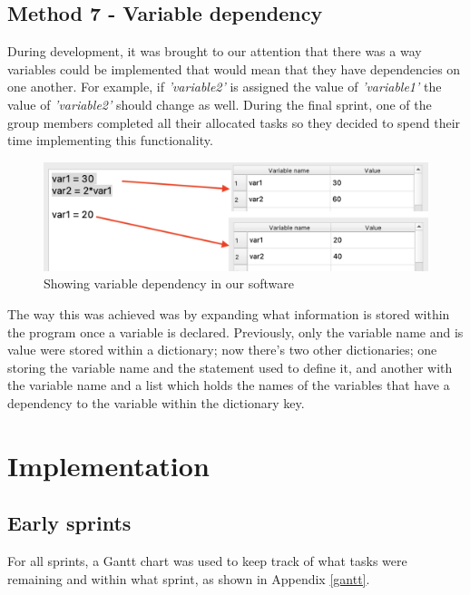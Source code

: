 \documentclass[a4paper, oneside, 11pt]{report}
\begin{document}
\section{Method 7 - Variable dependency}\label{variable-dep-sec}

During development, it was brought to our attention that there was a way variables could be implemented that would mean that they have dependencies on one another. For example, if \emph{'variable2'} is assigned the value of \emph{'variable1'} the value of \emph{'variable2'} should change as well. During the final sprint, one of the group members completed all their allocated tasks so they decided to spend their time implementing this functionality.

\begin{figure}[H]
    \centering
    \includegraphics[width=13cm]{variabledep.png}
    \caption{Showing variable dependency in our software}
    \label{fig:variable_dep}
\end{figure}

The way this was achieved was by expanding what information is stored within the program once a variable is declared. Previously, only the variable name and is value were stored within a dictionary; now there's two other dictionaries; one storing the variable name and the statement used to define it, and another with the variable name and a list which holds the names of the variables that have a dependency to the variable within the dictionary key. 

\chapter{Implementation}\label{Implementation}

\section{Early sprints}

For all sprints, a Gantt chart was used to keep track of what tasks were remaining and within what sprint, as shown in Appendix \ref{gantt}. 
\end{document}
